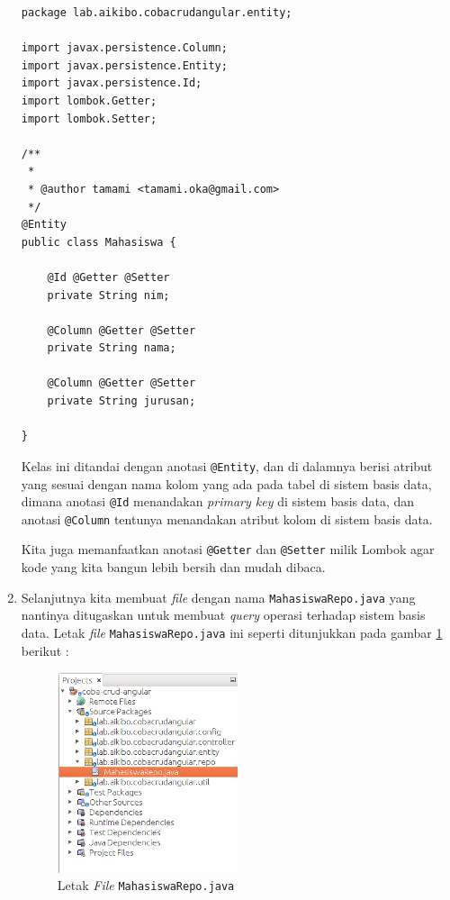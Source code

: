 \begin{enumerate}
	\begin{lstlisting}
package lab.aikibo.cobacrudangular.entity;

import javax.persistence.Column;
import javax.persistence.Entity;
import javax.persistence.Id;
import lombok.Getter;
import lombok.Setter;

/**
 *
 * @author tamami <tamami.oka@gmail.com>
 */
@Entity
public class Mahasiswa {
    
    @Id @Getter @Setter
    private String nim;
    
    @Column @Getter @Setter
    private String nama;
    
    @Column @Getter @Setter
    private String jurusan;
    
}
	\end{lstlisting}
	
	Kelas ini ditandai dengan anotasi \texttt{@Entity}, dan di dalamnya berisi atribut yang sesuai dengan nama kolom yang ada pada tabel di sistem basis data, dimana anotasi \texttt{@Id} menandakan \textit{primary key} di sistem basis data, dan anotasi \texttt{@Column} tentunya menandakan atribut kolom di sistem basis data.
	
	Kita juga memanfaatkan anotasi \texttt{@Getter} dan \texttt{@Setter} milik Lombok agar kode yang kita bangun lebih bersih dan mudah dibaca.
	
	\item Selanjutnya kita membuat \textit{file} dengan nama \texttt{MahasiswaRepo.java} yang nantinya ditugaskan untuk membuat \textit{query} operasi terhadap sistem basis data. Letak \textit{file} \texttt{MahasiswaRepo.java} ini seperti ditunjukkan pada gambar \ref{fig:letak-mahasiswa-repo} berikut :
	
	\begin{figure}[H]
		\centering
		\includegraphics[width=0.5\textwidth]{./resources/033-letak-mahasiswa-repo}
		\caption{Letak \textit{File} \texttt{MahasiswaRepo.java}}
		\label{fig:letak-mahasiswa-repo}
	\end{figure}
	

\end{enumerate}
